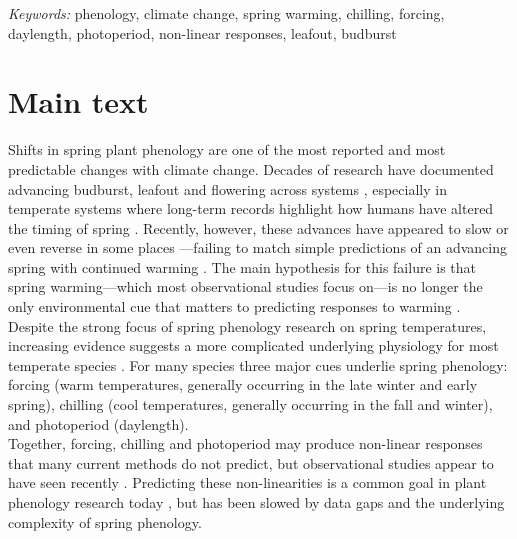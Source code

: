 \documentclass[11pt,letter]{article}
\begin{document}
\noindent \emph{Keywords:} phenology, climate change, spring warming, chilling, forcing, daylength, photoperiod, non-linear responses, leafout, budburst\\

\newpage
\linenumbers
\section{Main text} %
Shifts in spring plant phenology are one of the most reported and most predictable changes with climate change. Decades of research have documented advancing budburst, leafout and flowering across systems \citep{delpierre2009, yu2010,Ellwood2012,jochner2013,hereford2017}, especially in temperate systems where long-term records highlight how humans have altered the timing of spring \citep{Schwartz:1997nn,Menzel2003a,menzel2006}. Recently, however, these advances have appeared to slow \citep{fu2015} or even reverse in some places \citep{yu2010}---failing to match simple predictions of an advancing spring with continued warming \citep{Ellwood2012}. The main hypothesis for this failure is that spring warming---which most observational studies focus on---is no longer the only environmental cue that matters to predicting responses to warming \citep{chuine2016,gauzere2019}.\\

Despite the strong focus of spring phenology research on spring temperatures, increasing evidence suggests a more complicated underlying physiology for most temperate species \citep[e.g.,][]{zohner2016,gauzere2019,ettinger2020}. For many species three major cues underlie spring phenology: forcing (warm temperatures, generally occurring in the late winter and early spring), chilling (cool temperatures, generally occurring in the fall and winter), and photoperiod (daylength). \\

Together, forcing, chilling and photoperiod may produce non-linear responses that many current methods do not predict, but observational studies appear to have seen recently \citep{fu2015}. Predicting these non-linearities is a common goal in plant phenology research today \citep{gusewell2017,martlusch2017,gauzere2019,chen2019,keenan2019}, but has been slowed by data gaps and the underlying complexity of spring phenology. \\
\end{document}
